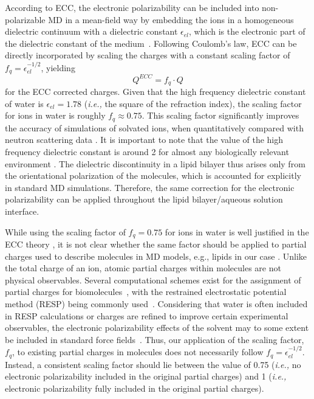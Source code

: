 \documentclass[journal=jpcbfk,manuscript=article]{achemso}
\begin{document}
According to ECC, the electronic polarizability can be included into non-polarizable MD in a mean-field way by 
embedding the ions in a homogeneous dielectric continuum with a dielectric constant $\epsilon_{el}$, which is the electronic part of the dielectric constant of the medium~\cite{leontyev11}. Following Coulomb's law,  ECC can be directly incorporated by scaling the charges with a constant scaling factor of $f_q = \epsilon _{el} ^{-1/2}$, yielding
\begin{equation}
Q^{ECC} = f_q \cdot Q
\end{equation}
for the ECC corrected charges. 
Given that the  high frequency dielectric constant of water is $\epsilon _{el} = 1.78$ (\textit{i.e.,} the square of the refraction index), the scaling factor for ions in water is roughly $f_q \approx 0.75$. This scaling factor significantly improves the accuracy of simulations of solvated ions, when quantitatively compared with neutron scattering data \cite{kohagen14,kohagen16, Pluharova2014, martinek17}.
It is important to note that the value of the
high frequency dielectric constant 
is around 2 for almost any biologically relevant environment \cite{leontyev11}.
The dielectric discontinuity in a lipid bilayer thus arises only
from the orientational polarization of the molecules, which is accounted for explicitly in standard MD simulations. 
Therefore, the same correction for the electronic polarizability can be 
applied throughout the lipid bilayer/aqueous solution interface.

While using the scaling factor of $f_q = 0.75$ for ions in water is well justified in the ECC theory \cite{leontyev11}, it is not clear whether the same factor should be applied to partial charges used to describe molecules in MD models, e.g., lipids in our case \cite{leontyev14}. Unlike the total charge of an ion, atomic partial charges within molecules are not physical observables. Several computational schemes exist for the assignment of partial charges for biomolecules~\cite{Hu2007}, with the restrained electrostatic potential method (RESP) being commonly used~\cite{RESP_paper, Singh1984}. Considering that water is often included in RESP calculations or charges are refined to improve certain experimental observables, the electronic polarizability effects of the solvent may to some extent be included in standard force fields~\cite{RESP_paper, Singh1984, jorgensen96, ipolq2013, benavides17}. Thus, our application of the scaling factor, $f_q$, to existing partial charges in molecules does not necessarily follow $f_q = \epsilon _{el} ^{-1/2}$. Instead, a consistent scaling factor should lie between the value of 0.75  (\textit{i.e.,} no electronic polarizability included in the original partial charges) and 1 (\textit{i.e.,} electronic polarizability fully included in the original partial charges). 
\end{document}
